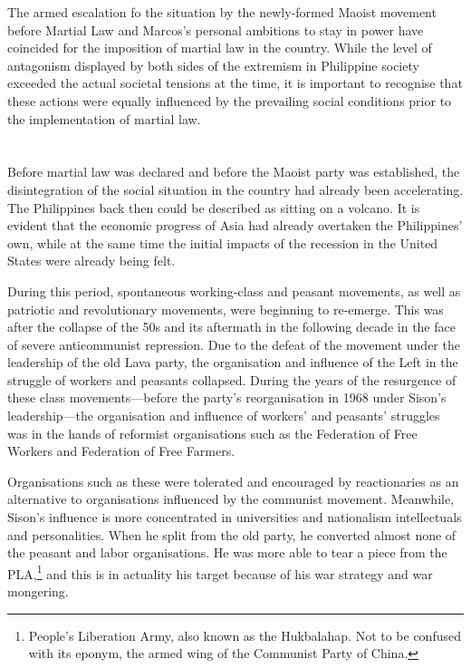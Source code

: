 The armed escalation fo the situation 
by the newly-formed Maoist movement 
before Martial Law and Marcos's personal ambitions 
to stay in power 
have coincided for the imposition of martial law in the country.
While the level of antagonism displayed by both sides of the extremism 
in Philippine society 
exceeded the actual societal tensions at the time, 
it is important to recognise 
that these actions were equally influenced 
by the prevailing social conditions 
prior to the implementation of martial law.



\section{}
Before martial law was declared 
and before the Maoist party was established, 
the disintegration of the social situation in the country 
had already been accelerating.
The Philippines back then could be described as sitting on a volcano.
It is evident that 
the economic progress of Asia had already overtaken the Philippines' own,
while at the same time the initial impacts of the recession in the United States
were already being felt.

During this period, 
spontaneous working-class and peasant movements, 
as well as patriotic and revolutionary movements, 
were beginning to re-emerge.
This was after the collapse of the 50s 
and its aftermath in the following decade 
in the face of severe anticommunist repression.
Due to the defeat of the movement 
under the leadership of the old Lava party, 
the organisation and influence of the Left 
in the struggle of workers and peasants collapsed.
During the years of the resurgence of these class movements---before 
the party's reorganisation in 1968 under Sison's leadership---the 
organisation and influence of workers' and peasants' struggles 
was in the hands of reformist organisations 
such as the Federation of Free Workers 
and Federation of Free Farmers.

Organisations such as these 
were tolerated and encouraged by reactionaries 
as an alternative to organisations 
influenced by the communist movement. 
Meanwhile, Sison's influence is more concentrated 
in universities and nationalism intellectuals and personalities. 
When he split from the old party, 
he converted almost none of the peasant and labor organisations. 
He was more able to tear a piece from the PLA,\footnote{
    People's Liberation Army, also known as the Hukbalahap.
    Not to be confused with its eponym, 
    the armed wing of the Communist Party of China.
}
and this is in actuality his target 
because of his war strategy and war mongering.


